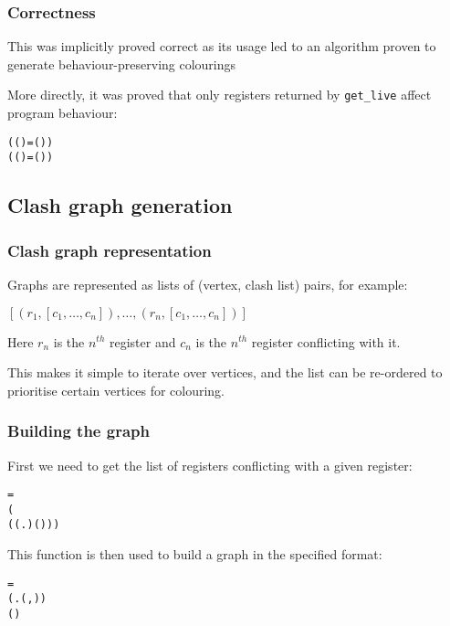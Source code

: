 \documentclass{beamer}
\begin{document}
\begin{frame}[containsverbatim]
\frametitle{Correctness}
This was implicitly proved correct as its usage led to an algorithm proven to generate behaviour-preserving colourings

More directly, it was proved that only registers returned by \texttt{get\_live} affect program behaviour:

\begin{alltt}\small
	\HOLTokenTurnstile{} (  (  ) =   (  )) \HOLTokenImp{}
   ( (   )  =  (   ) )
\end{alltt}
\end{frame}

\subsection{Clash graph generation}
\begin{frame}
\frametitle{Clash graph representation}
Graphs are represented as lists of (vertex, clash list) pairs, for example:

$[ (r_1, [c_1, \ldots, c_n]), \ldots, (r_n, [c_1, \ldots, c_n]) ]$

Here $r_n$ is the $n^{th}$ register and $c_n$ is the $n^{th}$ register conflicting with it.

This makes it simple to iterate over vertices, and the list can be re-ordered to prioritise certain vertices for colouring.
\end{frame}

\begin{frame}[containsverbatim]
\frametitle{Building the graph}
First we need to get the list of registers conflicting with a given register:

\begin{alltt}\small
	    =
 
  (
     ( (\HOLTokenLambda{}.   ) (  )))
\end{alltt}

This function is then used to build a graph in the specified format:

\begin{alltt}\small
	   =
 (\HOLTokenLambda{}. (,   ))
  (  )
\end{alltt}
\end{frame}
\end{document}
